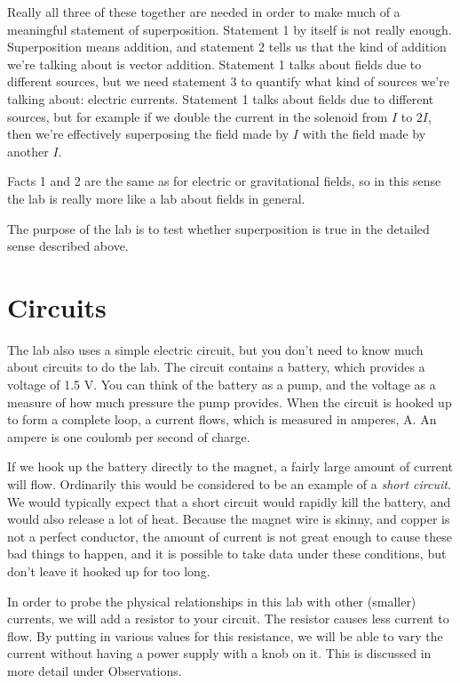Really all three of these together are needed in order to make much of a meaningful statement of superposition.
Statement 1 by itself is not really enough. 
Superposition means addition, and statement 2 tells us that the kind of addition we're talking about is vector addition.
Statement 1 talks about fields due to different sources, but we need statement 3 to quantify what kind of sources
we're talking about: electric currents.
Statement 1 talks about fields due to different sources, but for example if we double the current in
the solenoid from $I$ to $2I$, then we're effectively superposing the field	made by	$I$ with the field made
by another $I$.

Facts 1 and 2 are the same as for electric or gravitational fields, so in this sense the lab is really more like a lab about
fields in general.

The purpose of the lab is to test whether superposition is true in the detailed sense described above.

\section*{Circuits}

The lab also uses a simple electric circuit, but you don't need to know much about circuits to do the lab.
The circuit contains a battery, which provides a voltage of 1.5 V. You can think of the battery as a pump, and the
voltage as a measure of how much pressure the pump provides. When the circuit is hooked up to form a complete loop,
a current flows, which is measured in amperes, A. An ampere is one coulomb per second of charge.

If we hook up
the battery directly to the magnet, a fairly large amount of current will flow. Ordinarily this would be considered
to be an example of a \emph{short circuit}. We would typically expect that a short circuit would rapidly kill the battery, and
would also release a lot of heat.
Because the magnet wire is skinny, and copper is not a perfect conductor, the amount of current is not great
enough to cause these bad things to happen, and it is possible to take data under these conditions, but don't
leave it hooked up for too long.

In order to probe the physical relationships in this lab with other (smaller) currents, we will add a resistor to your circuit.
The resistor causes less current to flow. By putting in various values for this resistance,
we will be able to vary the current without having a power supply with a knob on it. This is discussed in more detail
under Observations.

